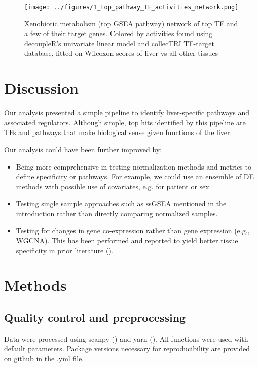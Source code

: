 \documentclass{article}
\begin{document}
\begin{figure}[htbp]
  \centering
  \texttt{[image: ../figures/1\_top\_pathway\_TF\_activities\_network.png]}
  \caption{Xenobiotic metabolism (top GSEA pathway) network of top TF and a few of their target genes. Colored by activities found using decoupleR's univariate linear model and collecTRI TF-target database, fitted on Wilcoxon scores of liver vs all other tissues}
  \label{fig:1_top_pathway_TF_activities_network}
\end{figure}
\FloatBarrier


\section{Discussion}
Our analysis presented a simple pipeline to identify liver-specific pathways and associated regulators. Although simple, top hits identified by this pipeline are TFs and pathways that make biological sense given functions of the liver.

Our analysis could have been further improved by:
\begin{itemize}
  \item Being more comprehensive in testing normalization methods and metrics to define specificity or pathways. For example, we could use an ensemble of DE methods with possible use of covariates, e.g. for patient or sex
  \item Testing single sample approaches such as ssGSEA mentioned in the introduction rather than directly comparing normalized samples. 
  \item Testing for changes in gene co-expression rather than gene expression (e.g., WGCNA). This has been performed and reported to yield better tissue specificity in prior literature (\cite{Sonawane2017-gs}).
\end{itemize}

\section{Methods}

\subsection{Quality control and preprocessing}
Data were processed using scanpy (\cite{Wolf2018-tw}) and yarn (\cite{Paulson2017-jv}). All functions were used with default parameters. Package versions necessary for reproducibility are provided on github in the .yml file.
\end{document}
